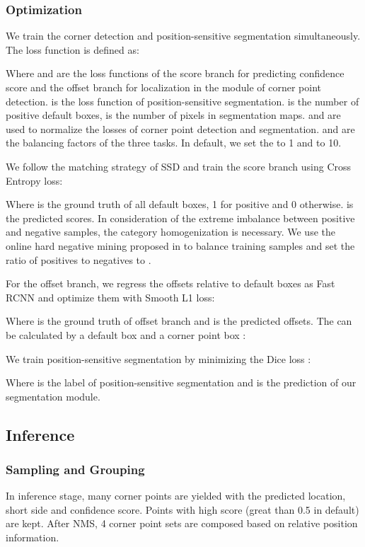 \documentclass[10pt,twocolumn,letterpaper]{article}
\begin{document}
\subsubsection{Optimization}
We train the corner detection and position-sensitive segmentation simultaneously. The loss function is defined as:

Where  and  are the loss functions of the score branch for predicting confidence score  and the offset branch for localization in the module of corner point detection.  is the loss function of position-sensitive segmentation.  is the number of positive default boxes,  is the number of pixels in segmentation maps.   and  are used to normalize the losses of corner point detection and segmentation.  and  are the balancing factors of the three tasks. In default, we set the  to 1 and   to 10.

We follow the matching strategy of SSD and train the score branch using Cross Entropy loss:



Where  is the ground truth of all default boxes, 1 for positive and 0 otherwise.  is the predicted scores. In consideration of the extreme imbalance between positive and negative samples, the category homogenization is necessary. We use the online hard negative mining proposed in \cite{shrivastava2016training} to balance training samples and set the ratio of positives to negatives to .

For the offset branch, we regress the offsets relative to  default boxes as Fast RCNN  \cite{Girshick_2015_ICCV} and optimize them with Smooth L1 loss:


Where  is the ground truth of offset branch and  is the predicted offsets. The  can be calculated by a default box  and a corner point box :








 
We train position-sensitive segmentation by minimizing the Dice loss \cite{milletari2016v}:

Where  is the label of position-sensitive segmentation and  is the prediction of our segmentation module.

\subsection{Inference}
\subsubsection{Sampling and Grouping}
In inference stage, many corner points are yielded with the predicted location, short side and confidence score. Points with high score (great than 0.5 in default) are kept. After NMS, 4 corner point sets are composed  based on relative position information.
\end{document}
